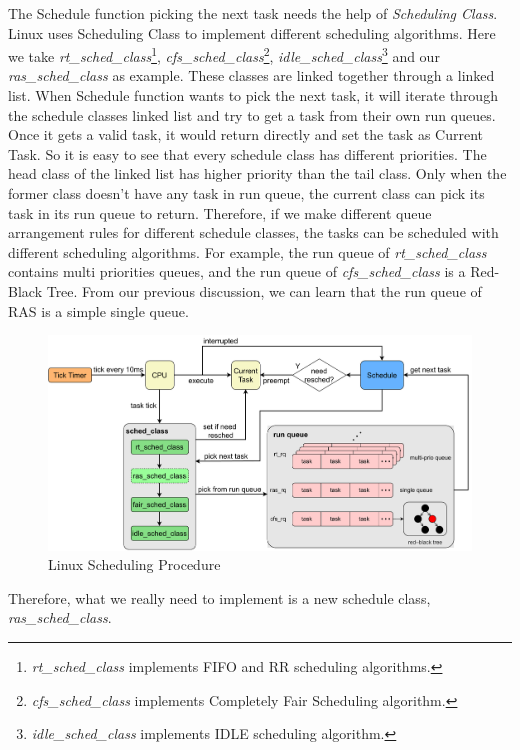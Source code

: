 The Schedule function picking the next task needs the help of \textit{Scheduling Class}. Linux uses Scheduling Class to implement different scheduling algorithms. Here we take \textit{rt\_sched\_class}\footnote{\textit{rt\_sched\_class} implements FIFO and RR scheduling algorithms.}, \textit{cfs\_sched\_class}\footnote{\textit{cfs\_sched\_class} implements Completely Fair Scheduling algorithm.}, \textit{idle\_sched\_class}\footnote{\textit{idle\_sched\_class} implements IDLE scheduling algorithm.} and our \textit{ras\_sched\_class} as example. These classes are linked together through a linked list. When Schedule function wants to pick the next task, it will iterate through the schedule classes linked list and try to get a task from their own run queues. Once it gets a valid task, it would return directly and set the task as Current Task. So it is easy to see that every schedule class has different priorities. The head class of the linked list has higher priority than the tail class. Only when the former class doesn't have any task in run queue, the current class can pick its task in its run queue to return. Therefore, if we make different queue arrangement rules for different schedule classes, the tasks can be scheduled with different scheduling algorithms. For example, the run queue of \textit{rt\_sched\_class} contains multi priorities queues, and the run queue of \textit{cfs\_sched\_class} is a Red-Black Tree. From our previous discussion, we can learn that the run queue of RAS is a simple single queue.

\begin{figure}[!htp]
  \centering
  \includegraphics[width=14cm]{figures/scheduler.drawio.pdf}
  \caption{Linux Scheduling Procedure}
\end{figure}

Therefore, what we really need to implement is a new schedule class, \textit{ras\_sched\_class}.

